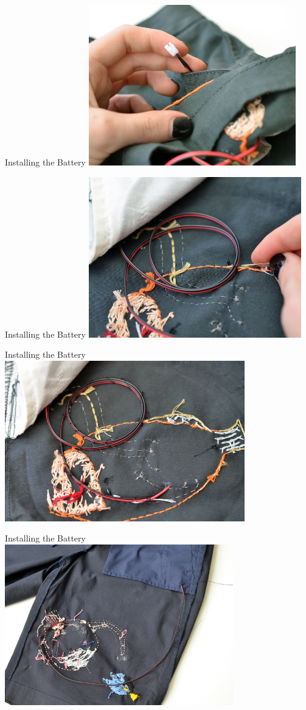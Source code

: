 \documentclass[aspectratio=169]{beamer}
\begin{document}
\begin{frame}[fragile]{Installing the Battery}
\includegraphics[height=2.75in]{flora-angler-embroidery-31.jpg}
\end{frame}
\begin{frame}[fragile]{Installing the Battery}
\includegraphics[height=2.75in]{flora-angler-embroidery-32.jpg}
\end{frame}
\begin{frame}[fragile]{Installing the Battery}
\includegraphics[height=2.75in]{flora-angler-embroidery-33.jpg}
\end{frame}
\begin{frame}[fragile]{Installing the Battery}
\includegraphics[height=2.75in]{flora-angler-embroidery-35.jpg}
\end{frame}
\end{document}
